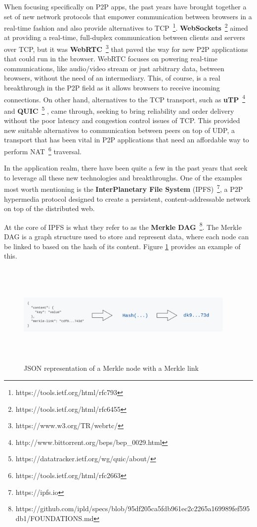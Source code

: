 When focusing specifically on P2P apps, the past years have brought
together a set of new network protocols that empower communication
between browsers in a real-time fashion and also provide alternatives to
TCP~\footnote{https://tools.ietf.org/html/rfc793}. \textbf{WebSockets}~\footnote{https://tools.ietf.org/html/rfc6455}
aimed at providing a real-time, full-duplex communication
between clients and servers over TCP, but it was \textbf{WebRTC}~\footnote{https://www.w3.org/TR/webrtc/}
that paved the way for new P2P applications that could
run in the browser. WebRTC focuses on powering real-time communications,
like audio/video stream or just arbitrary data, between browsers,
without the need of an intermediary. This, of course, is a real
breakthrough in the P2P field as it allows browsers to receive incoming
connections. On other hand, alternatives to the TCP transport, such as
\textbf{uTP}~\footnote{http://www.bittorrent.org/beps/bep\_0029.html} and
\textbf{QUIC}~\footnote{https://datatracker.ietf.org/wg/quic/about/}
, came through, seeking to bring reliability and order delivery
without the poor latency and congestion control issues of TCP. This
provided new suitable alternatives to communication between peers on top
of UDP, a transport that has been vital in P2P applications that need an
affordable way to perform NAT~\footnote{https://tools.ietf.org/html/rfc2663} traversal.

In the application realm, there have been quite a few in the past years
that seek to leverage all these new technologies and breakthroughs. One
of the examples most worth mentioning is the \textbf{InterPlanetary File
System} (IPFS)~\footnote{https://ipfs.io}, a P2P hypermedia protocol designed
to create a persistent, content-addressable network on top of the
distributed web.

At the core of IPFS is what they refer to as the \textbf{Merkle
DAG}~\footnote{https://github.com/ipld/specs/blob/95df205ca5fdb961ec2c2265a169989fef595db1/FOUNDATIONS.md}.
The Merkle DAG is a graph structure used to store and represent data, where
each node can be linked to based on the hash of its content. Figure
\ref{fig:merkle-node} provides an example of this. 

\begin{figure}[hb!]
  \centering
  \includegraphics[max height=5cm,max width=0.95\textwidth]{img/merkle-node.png}
  \caption{JSON representation of a Merkle node with a Merkle link}
  \label{fig:merkle-node}
\end{figure}

